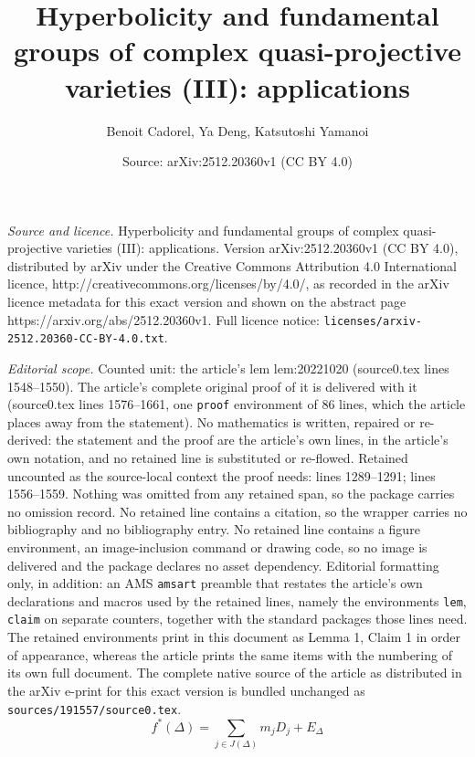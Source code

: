 \documentclass[10pt,a4paper]{amsart}
\title{Hyperbolicity and fundamental groups of complex quasi-projective varieties (III): applications}
\author{Benoit Cadorel, Ya Deng, Katsutoshi Yamanoi}
\date{Source: arXiv:2512.20360v1 (CC BY 4.0)}
\begin{document}
\maketitle

\noindent\emph{Source and licence.} Hyperbolicity and fundamental groups of complex quasi-projective varieties (III): applications. Version arXiv:2512.20360v1 (CC BY 4.0), distributed by arXiv under the Creative Commons Attribution 4.0 International licence, http://creativecommons.org/licenses/by/4.0/, as recorded in the arXiv licence metadata for this exact version and shown on the abstract page https://arxiv.org/abs/2512.20360v1. Full licence notice: \texttt{licenses/arxiv-2512.20360-CC-BY-4.0.txt}.\par\smallskip

\noindent\textit{Editorial scope.} Counted unit: the article's lem lem:20221020 (source0.tex lines 1548--1550). The article's complete original proof of it is delivered with it (source0.tex lines 1576--1661, one \texttt{proof} environment of 86 lines, which the article places away from the statement). No mathematics is written, repaired or re-derived: the statement and the proof are the article's own lines, in the article's own notation, and no retained line is substituted or re-flowed.  Retained uncounted as the source-local context the proof needs: lines 1289--1291; lines 1556--1559.  Nothing was omitted from any retained span, so the package carries no omission record.  No retained line contains a citation, so the wrapper carries no bibliography and no bibliography entry.  No retained line contains a figure environment, an image-inclusion command or drawing code, so no image is delivered and the package declares no asset dependency.  Editorial formatting only, in addition: an AMS \texttt{amsart} preamble that restates the article's own declarations and macros used by the retained lines, namely the environments \texttt{lem}, \texttt{claim} on separate counters, together with the standard packages those lines need.  The retained environments print in this document as Lemma 1, Claim 1 in order of appearance, whereas the article prints the same items with the numbering of its own full document.  The complete native source of the article as distributed in the arXiv e-print for this exact version is bundled unchanged as \texttt{sources/191557/source0.tex}.
\begin{equation}\label{eqn:div}
f^*(\Delta )=\sum_{j\in J(\Delta )}m_jD_j+E_{\Delta}
\end{equation}
\end{document}
